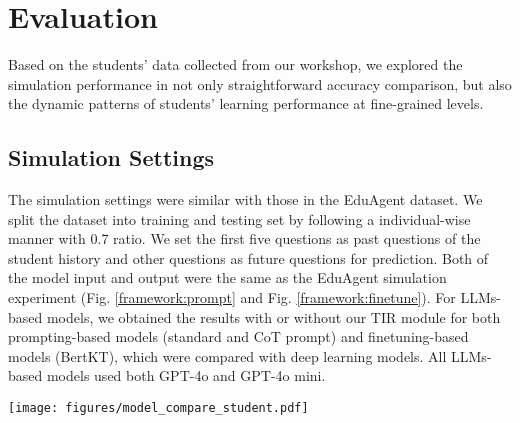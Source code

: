 

\section{Evaluation}
\label{sec: user study}

Based on the students' data collected from our workshop, we explored the simulation performance in not only straightforward accuracy comparison, but also the dynamic patterns of students' learning performance at fine-grained levels.



\subsection{Simulation Settings}
The simulation settings were similar with those in the EduAgent dataset. 
We split the dataset into training and testing set by following a individual-wise manner with 0.7 ratio. 
We set the first five questions as past questions of the student history and other questions as future questions for prediction.
Both of the model input and output were the same as the EduAgent simulation experiment (Fig. \ref{framework:prompt} and Fig. \ref{framework:finetune}).
For LLMs-based models, we obtained the results with or without our TIR module for both prompting-based models (standard and CoT prompt) and finetuning-based models (BertKT), which were compared with deep learning models. 
All LLMs-based models used both GPT-4o and GPT-4o mini. 


\begin{figure*}
\centering
\texttt{[image: figures/model\_compare\_student.pdf]}
\caption{
}
\label{model compare student}
\end{figure*}

